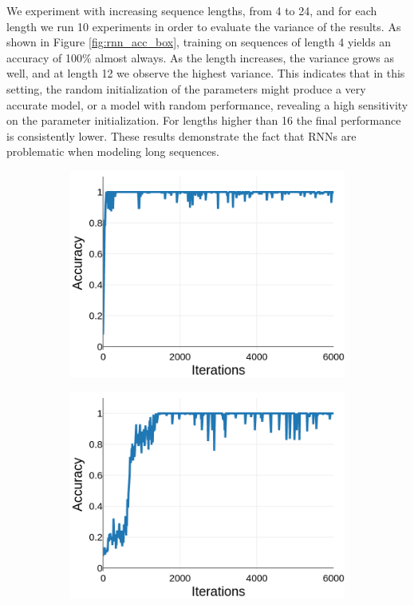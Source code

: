 \documentclass{article}
\begin{document}
We experiment with increasing sequence lengths, from 4 to 24, and for each length we run 10 experiments in order to evaluate the variance of the results. As shown in Figure \ref{fig:rnn_acc_box}, training on sequences of length 4 yields an accuracy of 100\% almost always. As the length increases, the variance grows as well, and at length 12 we observe the highest variance. This indicates that in this setting, the random initialization of the parameters might produce a very accurate model, or a model with random performance, revealing a high sensitivity on the parameter initialization. For lengths higher than 16 the final performance is consistently lower. These results demonstrate the fact that RNNs are problematic when modeling long sequences.

\begin{figure}[t]
\begin{subfigure}{0.49\textwidth}
\centering
\includegraphics[scale=0.22]{img/rnn-acc-L5}
\caption{}
\end{subfigure}
\begin{subfigure}{0.49\textwidth}
\centering
\includegraphics[scale=0.22]{img/rnn-acc-L15}

\end{subfigure}
\end{figure}
\end{document}
